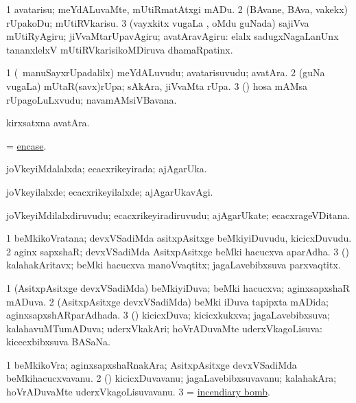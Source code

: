 \bentry
{}
\gl{\sakirx}
\bmng
\bnum
\num{1} avatarisu; meYdALuvaMte, mUtiRmatAtxgi mADu. 
\num{2} (BAvane, BAva, \mo vakekx) rUpakoDu; mUtiRVkarisu. 
\num{3} (vayxkitx \mo vugaLa \vi, oMdu guNada) sajiVva mUtiRyAgiru; jiVvaMtarUpavAgiru; avatAravAgiru:  elalx sadugxNagaLanUnx tananxlelxV mUtiRVkarisikoMDiruva dhamaRpatinx. 
\enum
\emng
\eentry

\bentry
{}
\gl{\nA}
\bmng
\bnum
\num{1} (\kanmu\ manuSayxrUpadalilx) meYdALuvudu; avatarisuvudu; avatAra. 
\num{2} (guNa \mo vugaLa) mUtaR(savx)rUpa; sAkAra, jiVvaMta rUpa. 
\num{3} (\veYshA) hosa mAMsa rUpagoLuLxvudu; navamAMsiVBavana. 
\enum
\emng

\noindent
\gl{\pagu}
\bmng
{} kirxsatxna avatAra. 
\emng
\eentry

\bentry
{}
\gl{\sakirx}
\bmng
= \hyperref{kandict_e.pdf}{E}{encase}{encase}. 
\emng
\eentry

\bentry
{}
\gl{\gu}
\bmng
joVkeyiMdalalxda; ecacxrikeyirada; ajAgarUka. 
\emng
\eentry

\bentry
{}
\gl{\kirxvi}
\bmng
joVkeyilalxde; ecacxrikeyilalxde; ajAgarUkavAgi. 
\emng
\eentry

\bentry
{}
\gl{\nA}
\bmng
joVkeyiMdilalxdiruvudu; ecacxrikeyiradiruvudu; ajAgarUkate; ecacxrageVDitana. 
\emng
\eentry

\bentry
{}
\gl{\nA}
\bmng
\bnum
\num{1} beMkikoVratana; devxVSadiMda asitxpAsitxge beMkiyiDuvudu, kicicxDuvudu. 
\num{2} aginx sapxshaR; devxVSadiMda AsitxpAsitxge beMki hacucxva aparAdha. 
\num{3} (\rUpa) kalahakAritavx; beMki hacucxva manoVvaqtitx; jagaLavebibxsuva parxvaqtitx. 
\enum
\emng
\eentry

\bentry
{}
\gl{\gu}
\bmng
\bnum
\num{1} (AsitxpAsitxge devxVSadiMda) beMkiyiDuva; beMki hacucxva; aginxsapxshaR mADuva. 
\num{2} (AsitxpAsitxge devxVSadiMda) beMki iDuva tapipxta mADida; aginxsapxshARparAdhada. 
\num{3} (\rUpa) kicicxDuva; kicicxkukxva; jagaLavebibxsuva; kalahavuMTumADuva; uderxVkakAri; hoVrADuvaMte uderxVkagoLisuva:  kicecxbibxsuva BASaNa. 
\enum
\emng
\eentry

\bentry
{}
\gl{\nA}
\bmng
\bnum
\num{1} beMkikoVra; aginxsapxshaRnakAra; AsitxpAsitxge devxVSadiMda beMkihacucxvavanu. 
\num{2} (\rUpa) kicicxDuvavanu; jagaLavebibxsuvavanu; kalahakAra; hoVrADuvaMte uderxVkagoLisuvavanu. 
\num{3}  = \hyperlink{incendiary bomb}{incendiary bomb}. 
\enum
\emng
\eentry


